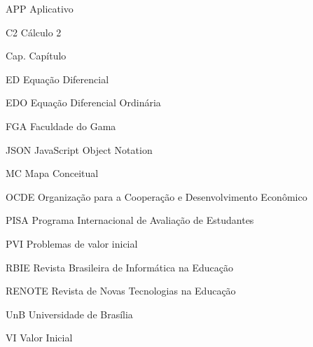 \begin{siglas}
  \item[APP] Aplicativo
  \item[C2] Cálculo 2
  \item[Cap.] Capítulo
  \item[ED] Equação Diferencial
  \item[EDO] Equação Diferencial Ordinária
  \item[FGA] Faculdade do Gama
  \item[JSON] JavaScript Object Notation
  \item[MC] Mapa Conceitual
  \item[OCDE] Organização para a Cooperação e Desenvolvimento Econômico
  \item[PISA] Programa Internacional de Avaliação de Estudantes
  \item[PVI] Problemas de valor inicial
  \item[RBIE] Revista Brasileira de Informática na Educação
  \item[RENOTE] Revista de Novas Tecnologias na Educação
  \item[UnB] Universidade de Brasília
  \item[VI] Valor Inicial
\end{siglas}
